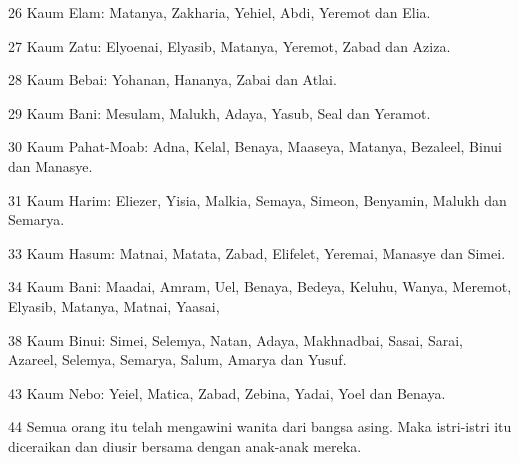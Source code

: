 \par 26 Kaum Elam: Matanya, Zakharia, Yehiel, Abdi, Yeremot dan Elia.
\par 27 Kaum Zatu: Elyoenai, Elyasib, Matanya, Yeremot, Zabad dan Aziza.
\par 28 Kaum Bebai: Yohanan, Hananya, Zabai dan Atlai.
\par 29 Kaum Bani: Mesulam, Malukh, Adaya, Yasub, Seal dan Yeramot.
\par 30 Kaum Pahat-Moab: Adna, Kelal, Benaya, Maaseya, Matanya, Bezaleel, Binui dan Manasye.
\par 31 Kaum Harim: Eliezer, Yisia, Malkia, Semaya, Simeon, Benyamin, Malukh dan Semarya.
\par 33 Kaum Hasum: Matnai, Matata, Zabad, Elifelet, Yeremai, Manasye dan Simei.
\par 34 Kaum Bani: Maadai, Amram, Uel, Benaya, Bedeya, Keluhu, Wanya, Meremot, Elyasib, Matanya, Matnai, Yaasai,
\par 38 Kaum Binui: Simei, Selemya, Natan, Adaya, Makhnadbai, Sasai, Sarai, Azareel, Selemya, Semarya, Salum, Amarya dan Yusuf.
\par 43 Kaum Nebo: Yeiel, Matica, Zabad, Zebina, Yadai, Yoel dan Benaya.
\par 44 Semua orang itu telah mengawini wanita dari bangsa asing. Maka istri-istri itu diceraikan dan diusir bersama dengan anak-anak mereka.


